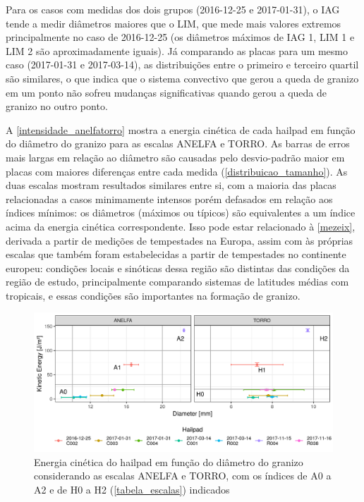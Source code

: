 Para os casos com medidas dos dois grupos (2016-12-25 e 2017-01-31), o IAG tende a medir diâmetros maiores que o LIM, que mede mais valores extremos principalmente no caso de 2016-12-25 (os diâmetros máximos de IAG 1, LIM 1 e LIM 2 são aproximadamente iguais). Já comparando as placas para um mesmo caso (2017-01-31 e 2017-03-14), as distribuições entre o primeiro e terceiro quartil são similares, o que indica que o sistema convectivo que gerou a queda de granizo em um ponto não sofreu mudanças significativas quando gerou a queda de granizo no outro ponto. 

A \autoref{intensidade_anelfatorro} mostra a energia cinética de cada hailpad em função do diâmetro do granizo para as escalas ANELFA e TORRO. As barras de erros mais largas em relação ao diâmetro são causadas pelo desvio-padrão maior em placas com maiores diferenças entre cada medida (\autoref{distribuicao_tamanho}). As duas escalas mostram resultados similares entre si, com a maioria das placas relacionadas a casos minimamente intensos porém defasados em relação aos índices mínimos: os diâmetros (máximos ou típicos) são equivalentes a um índice acima da energia cinética correspondente. Isso pode estar relacionado à \autoref{mezeix}, derivada a partir de medições de tempestades na Europa, assim com às próprias escalas que também foram estabelecidas a partir de tempestades no continente europeu: condições locais e sinóticas dessa região são distintas das condições da região de estudo, principalmente comparando sistemas de latitudes médias com tropicais, e essas condições são importantes na formação de granizo.

\begin{figure}[hbt]
	\begin{center}
		\caption{Energia cinética do hailpad em função do diâmetro do granizo considerando as escalas ANELFA e TORRO, com os índices de A0 a A2 e de H0 a H2 (\autoref{tabela_escalas}) indicados} 
		\label{intensidade_anelfatorro}
		\includegraphics[width=\columnwidth]{../Hailpads_Processing/figures/data_anelfa_torro.png}
	\end{center}
\end{figure}

